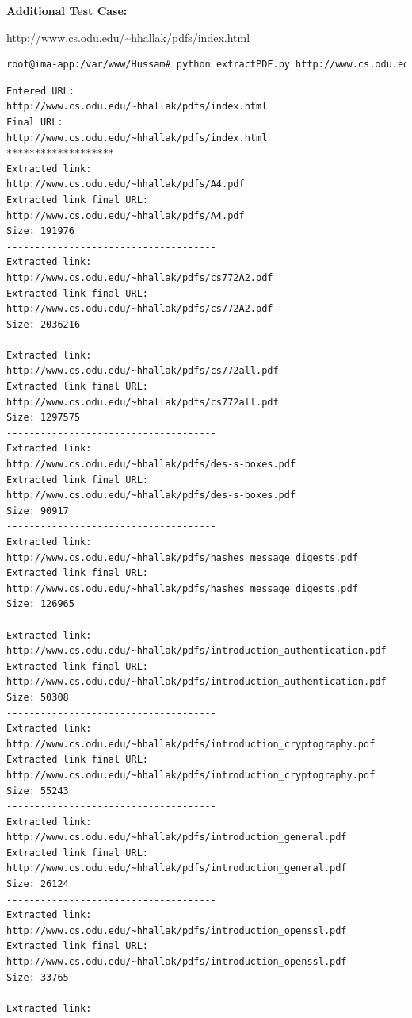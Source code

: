 \documentclass[a4paper, 11pt]{article}
\begin{document}
\noindent
\textbf{Additional Test Case:}

http://www.cs.odu.edu/\textasciitilde hhallak/pdfs/index.html

\begin{lstlisting}[language=bash,label=Command:,caption=Command:]
root@ima-app:/var/www/Hussam# python extractPDF.py http://www.cs.odu.edu/~hhallak/pdfs/index.html
\end{lstlisting}

\begin{lstlisting}[language=bash,label=Output:,caption=Output:]
Entered URL:
http://www.cs.odu.edu/~hhallak/pdfs/index.html
Final URL:
http://www.cs.odu.edu/~hhallak/pdfs/index.html
*******************
Extracted link:
http://www.cs.odu.edu/~hhallak/pdfs/A4.pdf
Extracted link final URL:
http://www.cs.odu.edu/~hhallak/pdfs/A4.pdf
Size: 191976
-------------------------------------
Extracted link:
http://www.cs.odu.edu/~hhallak/pdfs/cs772A2.pdf
Extracted link final URL:
http://www.cs.odu.edu/~hhallak/pdfs/cs772A2.pdf
Size: 2036216
-------------------------------------
Extracted link:
http://www.cs.odu.edu/~hhallak/pdfs/cs772all.pdf
Extracted link final URL:
http://www.cs.odu.edu/~hhallak/pdfs/cs772all.pdf
Size: 1297575
-------------------------------------
Extracted link:
http://www.cs.odu.edu/~hhallak/pdfs/des-s-boxes.pdf
Extracted link final URL:
http://www.cs.odu.edu/~hhallak/pdfs/des-s-boxes.pdf
Size: 90917
-------------------------------------
Extracted link:
http://www.cs.odu.edu/~hhallak/pdfs/hashes_message_digests.pdf
Extracted link final URL:
http://www.cs.odu.edu/~hhallak/pdfs/hashes_message_digests.pdf
Size: 126965
-------------------------------------
Extracted link:
http://www.cs.odu.edu/~hhallak/pdfs/introduction_authentication.pdf
Extracted link final URL:
http://www.cs.odu.edu/~hhallak/pdfs/introduction_authentication.pdf
Size: 50308
-------------------------------------
Extracted link:
http://www.cs.odu.edu/~hhallak/pdfs/introduction_cryptography.pdf
Extracted link final URL:
http://www.cs.odu.edu/~hhallak/pdfs/introduction_cryptography.pdf
Size: 55243
-------------------------------------
Extracted link:
http://www.cs.odu.edu/~hhallak/pdfs/introduction_general.pdf
Extracted link final URL:
http://www.cs.odu.edu/~hhallak/pdfs/introduction_general.pdf
Size: 26124
-------------------------------------
Extracted link:
http://www.cs.odu.edu/~hhallak/pdfs/introduction_openssl.pdf
Extracted link final URL:
http://www.cs.odu.edu/~hhallak/pdfs/introduction_openssl.pdf
Size: 33765
-------------------------------------
Extracted link:

\end{lstlisting}
\end{document}
